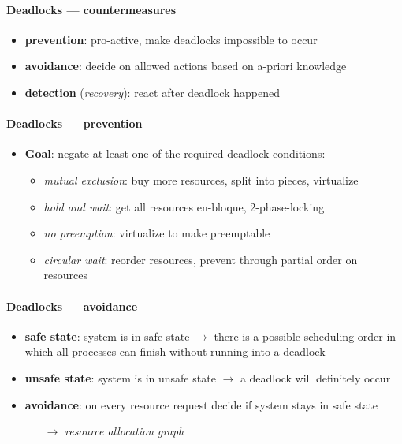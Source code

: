 \paragraph{Deadlocks --- countermeasures}
\begin{itemize}
  \item \textbf{prevention}: pro-active, make deadlocks impossible to occur
  \item \textbf{avoidance}: decide on allowed actions based on a-priori knowledge
  \item \textbf{detection} (\emph{recovery}): react after deadlock happened
\end{itemize}

\paragraph{Deadlocks --- prevention}
\begin{itemize}
  \item \textbf{Goal}: negate at least one of the required deadlock conditions:
  \begin{itemize}
    \item \emph{mutual exclusion}: buy more resources, split into pieces, virtualize
    \item \emph{hold and wait}: get all resources en-bloque, 2-phase-locking
    \item \emph{no preemption}: virtualize to make preemptable
    \item \emph{circular wait}: reorder resources, prevent through partial order on resources
  \end{itemize}
\end{itemize}

\paragraph{Deadlocks --- avoidance}
\begin{itemize}
  \item \textbf{safe state}: system is in safe state $ \to $ there is a possible scheduling order in which all processes can finish without running into a deadlock
  \item \textbf{unsafe state}: system is in unsafe state $ \to $ a deadlock will definitely occur
  \item \textbf{avoidance}: on every resource request decide if system stays in safe state
  \begin{itemize}
    \item[$ \to $] \emph{resource allocation graph}
  \end{itemize}
\end{itemize}

